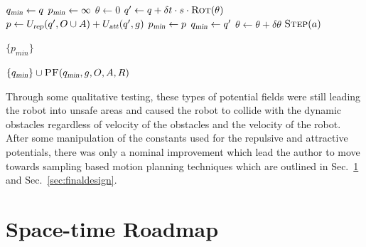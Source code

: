 \begin{algorithm}[ht]

    \caption{$\Function{PF}(q, g, O, A, R)$}

    \label{algo:pf}
    \begin{algorithmic}[1]
        \setcounter{ALC@line}{0}
        \vspace*{1mm}

        \STATE $q_{\Var{min}} \leftarrow q$
        \STATE $p_{\Var{min}} \leftarrow \infty$
        \STATE $\theta \leftarrow 0$
        \WHILE {$\theta \leq 2\pi$}
            \STATE $q' \leftarrow q + \delta t \cdot s \cdot
            \Function{Rot}(\theta)$
            \STATE $p \leftarrow U_{\Var{rep}}(q', O \cup A)
            + U_{\Var{att}}(q', g)$
               \STATE $p_{\Var{min}} \leftarrow p$
                \STATE $q_{\Var{min}} \leftarrow q'$
            \ENDIF
            \STATE $\theta \leftarrow \theta + \delta \theta$
                \STATE $\Function{Step}(a)$
            \ENDFOR
        \ENDWHILE

            \RETURN $\{p_{min}\}$
        \ENDIF

        \RETURN $\{q_{\Var{min}}\} \cup \Function{PF}(q_{\Var{min}}, g, O, A, R)$
    \end{algorithmic}
\end{algorithm}

Through some qualitative testing, these types of potential fields were still
leading the robot into unsafe areas and caused the robot to collide with the
dynamic obstacles regardless of velocity of the obstacles and the velocity of
the robot. After some manipulation of the constants used for the repulsive and
attractive potentials, there was only a nominal improvement which lead the
author to move towards sampling based motion planning techniques which are
outlined in Sec.~\ref{sec:stroadmap} and Sec.~\ref{sec:finaldesign}.

\section{Space-time Roadmap}

\label{sec:stroadmap}

